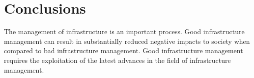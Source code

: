 \section{Conclusions}
The management of infrastructure is an important process. Good infrastructure management can result in substantially reduced negative impacts to society when compared to bad infrastructure management. Good infrastructure management requires the exploitation of the latest advances in the field of infrastructure management.


